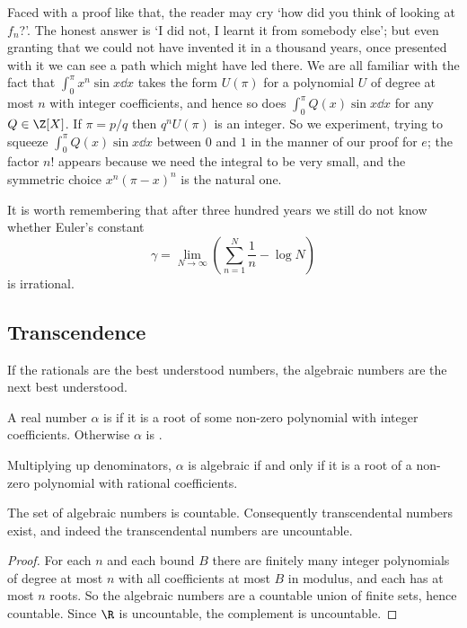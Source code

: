 Faced with a proof like that, the reader may cry `how did you think of looking at $f_n$?'. The honest answer is `I did not, I learnt it from somebody else'; but even granting that we could not have invented it in a thousand years, once presented with it we can see a path which might have led there. We are all familiar with the fact that $\int_0^\pi x^n\sin x\dd x$ takes the form $U(\pi)$ for a polynomial $U$ of degree at most $n$ with integer coefficients, and hence so does $\int_0^\pi Q(x)\sin x\dd x$ for any $Q\in\Z[X]$. If $\pi=p/q$ then $q^nU(\pi)$ is an integer. So we experiment, trying to squeeze $\int_0^\pi Q(x)\sin x\dd x$ between $0$ and $1$ in the manner of our proof for $e$; the factor $n!$ appears because we need the integral to be very small, and the symmetric choice $x^n(\pi-x)^n$ is the natural one.

It is worth remembering that after three hundred years we still do not know whether Euler's constant
$$\gamma = \lim_{N\to\infty}\left(\sum_{n=1}^N\frac1n - \log N\right)$$
is irrational.

\subsection{Transcendence}

If the rationals are the best understood numbers, the algebraic numbers are the next best understood.

\begin{definition}
	A real number $\alpha$ is  if it is a root of some non-zero polynomial with integer coefficients. Otherwise $\alpha$ is .
\end{definition}

Multiplying up denominators, $\alpha$ is algebraic if and only if it is a root of a non-zero polynomial with rational coefficients.

\begin{lemma}
	The set of algebraic numbers is countable. Consequently transcendental numbers exist, and indeed the transcendental numbers are uncountable.
\end{lemma}

\begin{proof}
	For each $n$ and each bound $B$ there are finitely many integer polynomials of degree at most $n$ with all coefficients at most $B$ in modulus, and each has at most $n$ roots. So the algebraic numbers are a countable union of finite sets, hence countable. Since $\R$ is uncountable, the complement is uncountable.
\end{proof}


